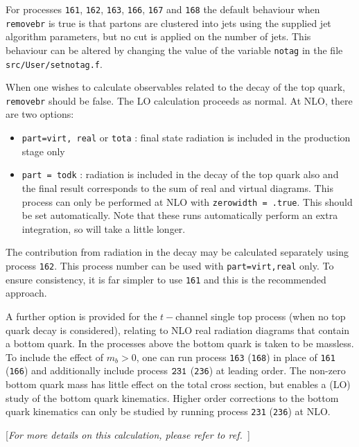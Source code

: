 For processes {\tt 161}, {\tt 162}, {\tt 163}, {\tt 166}, {\tt 167}
and {\tt 168} the default behaviour when {\tt removebr} is true is that
partons are clustered into jets using the supplied jet
algorithm parameters, but no cut is applied on the number of jets.
This behaviour can be altered by changing the value of the
variable {\tt notag} in the file {\tt src/User/setnotag.f}.
 
When one wishes to calculate observables related to the decay of the top
quark, {\tt removebr} should be false.
The LO calculation proceeds as normal. At NLO, there are two options:
\begin{itemize}
\item {\tt part=virt, real} or {\tt tota} : final state radiation is included
in the production stage only
\item {\tt part = todk} : radiation is included in the decay of the top
quark also and the final result corresponds to the sum of real and virtual
diagrams. This process can only be performed at NLO with 
{\tt zerowidth = .true}. This should be set automatically.
Note that these runs automatically perform an extra integration, so
will take a little longer.
\end{itemize}

The contribution from radiation in the decay may be calculated separately using
process {\tt 162}. This process number can be used with {\tt part=virt,real}
only. To ensure consistency, it is far simpler to use {\tt 161}
and this is the recommended approach.

A further option is provided for the $t-$channel single top process (when no
top quark decay is considered), relating to NLO real radiation diagrams that
contain a bottom quark. In the processes above the bottom quark is taken to
be massless. To include the effect of $m_b > 0$, one can run process
{\tt 163} ({\tt 168}) in place of {\tt 161} ({\tt 166}) and additionally include
process $\tt 231$ ({\tt 236}) at leading order.
The non-zero bottom quark mass has little effect on
the total cross section, but enables a (LO) study of the bottom quark kinematics.
Higher order corrections to the bottom quark kinematics can only be studied by running
process {\tt 231} ({\tt 236}) at NLO.

\label{subsec:offstop}
\begin{center}
	[{\it For more details on this calculation, please refer to ref.~\cite{Neumann:2019kvk}}]
\end{center}

